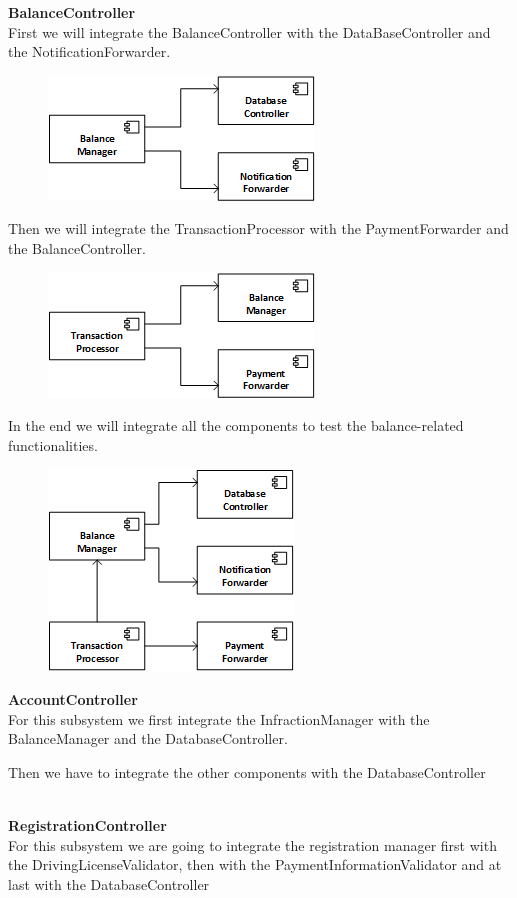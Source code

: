 \documentclass{article}
\begin{document}
\textbf{BalanceController}
\\
First we will integrate the BalanceController with the DataBaseController and the NotificationForwarder. 
\begin{figure}[H]
\includegraphics[scale=1]{Images/Balance/ManagerIntegration}
\centering
\end{figure}
Then we will integrate the TransactionProcessor with the PaymentForwarder and the BalanceController.
\begin{figure}[H]
\includegraphics[scale=1]{Images/Balance/TransactionIntegration}
\centering
\end{figure}
In the end we will integrate all the components to test the balance-related functionalities.
\\
\begin{figure}[H]
\includegraphics[scale=1]{Images/Balance/BalanceControllerStrategy}
\centering
\end{figure}


\textbf{AccountController}\\
For this subsystem we first integrate the InfractionManager with the BalanceManager and the DatabaseController.

Then we have to integrate the other components with the DatabaseController

\\
\textbf{RegistrationController}\\
For this subsystem we are going to integrate the registration manager first with the DrivingLicenseValidator, then with the PaymentInformationValidator and at last with the DatabaseController
\end{document}
